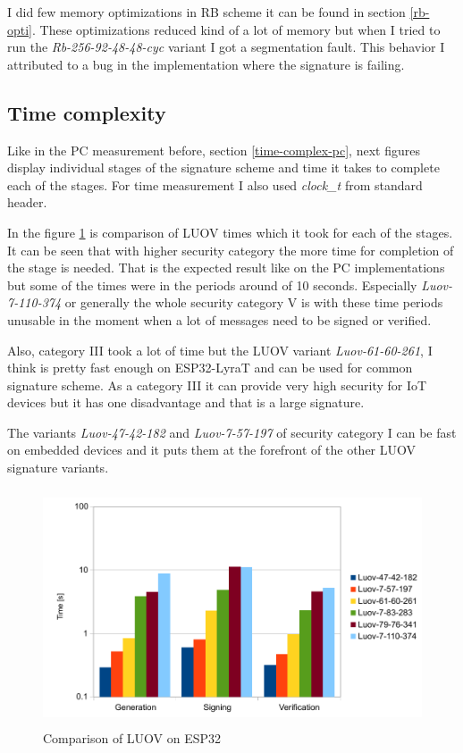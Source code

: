 \documentclass[thesis=M,english]{FITthesis}[2019/12/23]
\begin{document}
\bigskip
\noindent
I did few memory optimizations in RB scheme it can be found in section \ref{rb-opti}. These optimizations reduced kind of a lot of memory but when I tried to run the \textit{Rb-256-92-48-48-cyc} variant I got a segmentation fault. This behavior I attributed to a bug in the implementation where the signature is failing. 

\subsection{Time complexity}
Like in the PC measurement before, section \ref{time-complex-pc}, next figures display individual stages of the signature scheme and time it takes to complete each of the stages. For time measurement I also used \textit{clock\_t} from standard header.

\bigskip
\noindent
In the figure \ref{time-luov} is comparison of LUOV times which it took for each of the stages. It can be seen that with higher security category the more time for completion of the stage is needed. That is the expected result like on the PC implementations but some of the times were in the periods around of 10 seconds. Especially \textit{Luov-7-110-374} or generally the whole security category V is with these time periods unusable in the moment when a lot of messages need to be signed or verified.

\bigskip
\noindent
Also, category III took a lot of time but the LUOV variant \textit{Luov-61-60-261}, I think is pretty fast enough on ESP32-LyraT and can be used for common signature scheme. As a category III it can provide very high security for IoT devices but it has one disadvantage and that is a large signature.

\bigskip
\noindent
The variants \textit{Luov-47-42-182} and \textit{Luov-7-57-197} of security category I can be fast on embedded devices and it puts them at the forefront of the other LUOV signature variants.

\bigskip
\begin{figure}[H]
\centering
\includegraphics[width=13cm,height=7cm]{images/time-luov.pdf}
\caption{Comparison of LUOV on ESP32}
\label{time-luov}
\end{figure}
\end{document}
